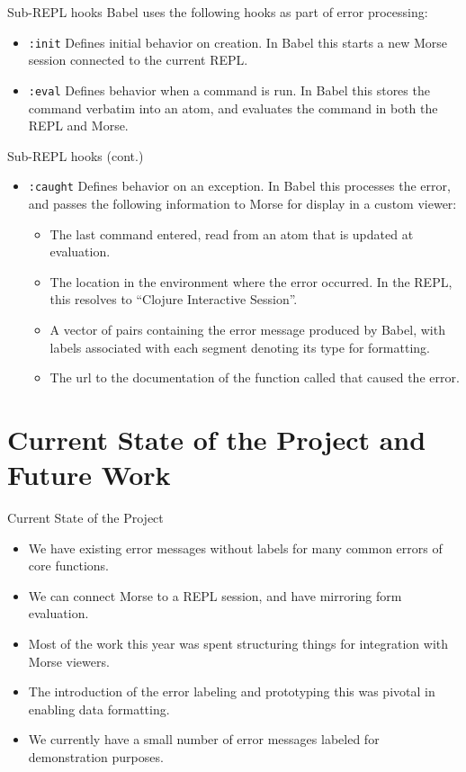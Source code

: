 \documentclass{beamer}
\begin{document}
\begin{frame}{Sub-REPL hooks}
  Babel uses the following hooks as part of error processing:
  \begin{itemize}
    \item<1-> \texttt{:init} Defines initial behavior on creation. In Babel this starts a new Morse session connected to the current REPL.
    \item<2-> \texttt{:eval} Defines behavior when a command is run. In Babel this stores the command verbatim into an atom, and evaluates the command in both the REPL and Morse.  
  \end{itemize}
\end{frame}

\begin{frame}{Sub-REPL hooks (cont.)}
  \begin{itemize}
  \item<1-> \texttt{:caught} Defines behavior on an exception. In Babel this processes the error, and passes the following information to Morse for display in a custom viewer:
  \begin{itemize}
    \item<2-> The last command entered, read from an atom that is updated at evaluation.
    \item<3-> The location in the environment where the error occurred. In the REPL, this
    resolves to “Clojure Interactive Session”.
    \item<4-> A vector of pairs containing the error message produced by Babel, with labels associated with each segment denoting its type for formatting.
    \item<5-> The url to the documentation of the function called that caused the error.
  \end{itemize}
\end{itemize}
\end{frame}

\section{Current State of the Project and Future Work}
\begin{frame}{Current State of the Project}
  \begin{itemize}
    \item<1-> We have existing error messages without labels for many common errors of core functions.
    \item<2-> We can connect Morse to a REPL session, and have mirroring form evaluation.
    \item<3-> Most of the work this year was spent structuring things for integration with Morse viewers.
    \item<4-> The introduction of the error labeling and prototyping this was pivotal in enabling data formatting.
    \item<5-> We currently have a small number of error messages labeled for demonstration purposes.
  \end{itemize}
\end{frame}
\end{document}
